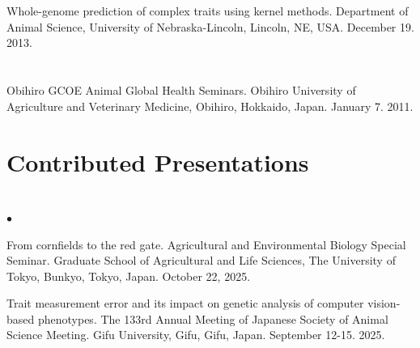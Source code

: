 \documentclass[margin,line,10pt]{res}
\newenvironment{list1}{
  \begin{list}{\ding{113}}{%
      \setlength{\itemsep}{0in}
      \setlength{\parsep}{0in} \setlength{\parskip}{0in}
      \setlength{\topsep}{0in} \setlength{\partopsep}{0in} 
      \setlength{\leftmargin}{0.17in}}}{\end{list}}
\newenvironment{list2}{
  \begin{list}{$\bullet$}{%
      \setlength{\itemsep}{0in}
      \setlength{\parsep}{0in} \setlength{\parskip}{0in}
      \setlength{\topsep}{0in} \setlength{\partopsep}{0in} 
      \setlength{\leftmargin}{0.2in}}}{\end{list}}
\begin{document}
\begin{resume}
\section{}
\begin{list1}
\item [{\bf 2}.] Whole-genome prediction of complex traits using kernel methods. Department of Animal Science, University of Nebraska-Lincoln, Lincoln, NE, USA. December 19. 2013.
\end{list1}

\section{}
\begin{list1}
\item [{\bf 1}.] Obihiro GCOE Animal Global Health Seminars.  Obihiro University of Agriculture and  Veterinary Medicine, Obihiro, Hokkaido, Japan. January 7. 2011.
\end{list1}  



\vspace{0.5cm}
\section{\sc Contributed Presentations}
\vspace{1.0cm}

\section{}
\begin{list2}

  \item [{\bf 22}.] From cornfields to the red gate. Agricultural and Environmental Biology Special Seminar. Graduate School of Agricultural and Life Sciences, The University of Tokyo, Bunkyo, Tokyo, Japan. October 22, 2025. 

  \vspace{0.5cm}

  \item [{\bf 21}.] Trait measurement error and its impact on genetic analysis of computer vision-based phenotypes. The 133rd Annual Meeting of Japanese Society of Animal Science Meeting. Gifu University, Gifu, Gifu, Japan. September 12-15. 2025. 


\end{list2}
\end{resume}
\end{document}

